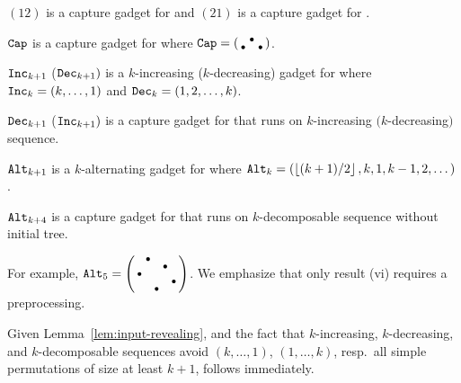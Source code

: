 \begin{lemma}
\label{lem:input-revealing}
\begin{compactenum}[(i)]
		\item $(12)$ is a capture gadget for \greedyright and $(21)$ is a capture
		gadget for \greedyleft.
		\item $\texttt{Cap}$ is a capture gadget for \greedy where $\texttt{Cap}=\left(\begin{smallmatrix}
		& \bullet\\
		\bullet &  & \bullet
		\end{smallmatrix}\right)$.
		\item $\texttt{Inc}_{k+1}$ ($\texttt{Dec}_{k+1})$ is a $k$-increasing ($k$-decreasing)
		gadget for \greedy where $\texttt{Inc}_{k}=(k,\dots,1)$ and \textup{$\texttt{Dec}_{k}=(1,2,\dots,k)$}. 
		\item $\texttt{Dec}_{k+1}$ ($\texttt{Inc}_{k+1})$ is a capture gadget for \greedy that
		runs on $k$-increasing $(k$-decreasing$)$ sequence.
		\item $\texttt{Alt}_{k+1}$ is a $k$-alternating gadget for \greedy where $\texttt{Alt}_{k}=(\left\lfloor (k+1)/2\right\rfloor,k,1,k-1,2,\dots)$.%
		\item $\texttt{Alt}_{k+4}$ is a capture gadget for \greedy that runs on $k$-decomposable
		sequence without initial tree.
	\end{compactenum}
\end{lemma}
For example, 
$
\texttt{Alt}_{5}=\left(\begin{smallmatrix}
& \bullet\\
&  &  & \bullet\\
\bullet\\
&  &  &  & \bullet\\
&  & \bullet
\end{smallmatrix}\right)
$. 
We emphasize that only result (vi) requires a preprocessing. 

Given Lemma~\ref{lem:input-revealing}, and the fact that $k$-increasing, $k$-decreasing, and $k$-decomposable sequences avoid 
$(k,\dots,1)$, $(1,\dots,k)$, resp.\ all simple permutations of size at least $k+1$,  follows immediately.

